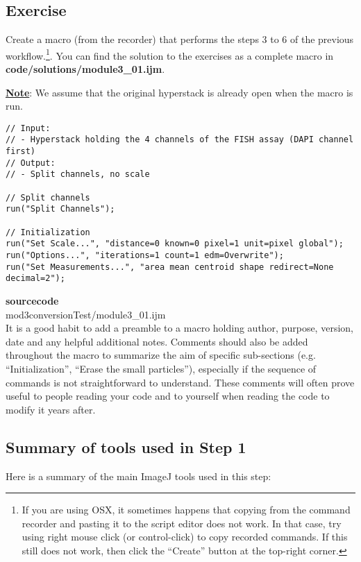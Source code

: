 \subsection{Exercise }
Create a macro (from the recorder) that performs the steps 3 to 6 of the previous workflow.\footnote{If you are using OSX, it sometimes happens that copying from the command recorder and pasting it to the script editor does not work. In that case, try using right mouse click (or control-click) to copy recorded commands. If this still does not work, then click the ``Create'' button at the top-right corner.}. You can find the solution to the exercises as a complete macro in \textbf{code/solutions/module3\_01.ijm}.

\underline{\textbf{Note}}: We assume that the original hyperstack is already open when the macro is run.


\begin{lstlisting}[linerange={1-4}]
// Input: 
// - Hyperstack holding the 4 channels of the FISH assay (DAPI channel first)
// Output: 
// - Split channels, no scale

// Split channels
run("Split Channels");

// Initialization
run("Set Scale...", "distance=0 known=0 pixel=1 unit=pixel global");
run("Options...", "iterations=1 count=1 edm=Overwrite");
run("Set Measurements...", "area mean centroid shape redirect=None decimal=2");
\end{lstlisting}
\textbf{sourcecode}\\
mod3conversionTest/module3\_01.ijm\\

It is a good habit to add a preamble to a macro holding author, purpose, version, date and any helpful additional notes. Comments should also be added throughout the macro to summarize the aim of specific sub-sections (e.g. ``Initialization'', ``Erase the small particles''), especially if the sequence of commands is not straightforward to understand. These comments will often prove useful to people reading your code and to yourself when reading the code to modify it years after.

\subsection{Summary of tools used in Step 1}

Here is a summary of the main ImageJ tools used in this step:

